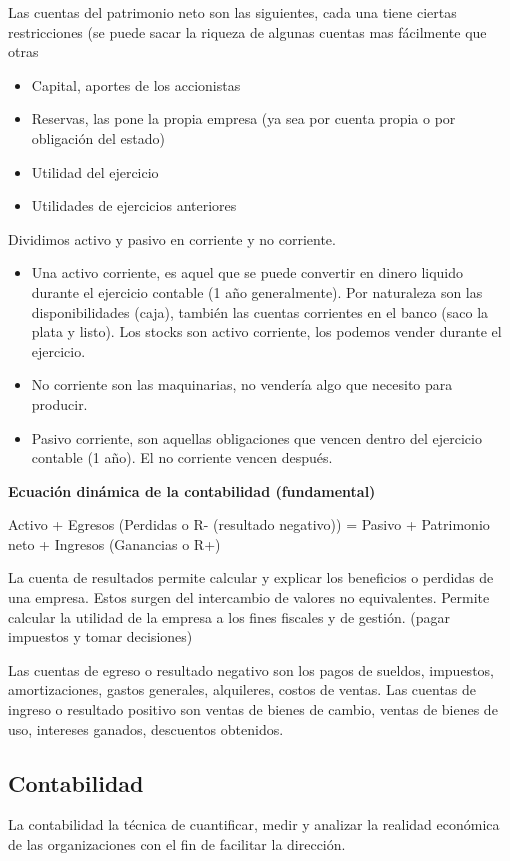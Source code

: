 \documentclass[titlepage,a4paper]{article}
\begin{document}
Las cuentas del patrimonio neto son las siguientes, cada una tiene ciertas restricciones (se puede sacar la riqueza de algunas cuentas mas fácilmente que otras
\begin{itemize}
\item Capital, aportes de los accionistas
\item Reservas, las pone la propia empresa (ya sea por cuenta propia o por obligación del estado)
\item Utilidad del ejercicio
\item Utilidades de ejercicios anteriores
\end{itemize}

Dividimos activo y pasivo en corriente y no corriente.
\begin{itemize}
\item Una activo corriente, es aquel que se puede convertir en dinero liquido durante el ejercicio contable (1 año generalmente). Por naturaleza son las disponibilidades (caja), también las cuentas corrientes en el banco (saco la plata y listo). Los stocks son activo corriente, los podemos vender durante el ejercicio.
\item No corriente son las maquinarias, no vendería algo que necesito para producir.
\item Pasivo corriente, son aquellas obligaciones que vencen dentro del ejercicio contable (1 año). El no corriente vencen después.
\end{itemize}


\textbf{Ecuación dinámica de la contabilidad (fundamental)}

\medskip

Activo + Egresos (Perdidas o R- (resultado negativo)) = Pasivo + Patrimonio neto + Ingresos (Ganancias o R+)

\medskip

La cuenta de resultados permite calcular y explicar los beneficios o perdidas de una empresa. Estos surgen del intercambio de valores no equivalentes. Permite calcular la utilidad de la empresa a los fines fiscales y de gestión. (pagar impuestos y tomar decisiones)

Las cuentas de egreso o resultado negativo son los pagos de sueldos, impuestos, amortizaciones, gastos generales, alquileres, costos de ventas.
Las cuentas de ingreso o resultado positivo son ventas de bienes de cambio, ventas de bienes de uso, intereses ganados, descuentos obtenidos.

\subsection{Contabilidad}
La contabilidad la técnica de cuantificar, medir y analizar la realidad económica de las organizaciones con el fin de facilitar la dirección.
\end{document}
